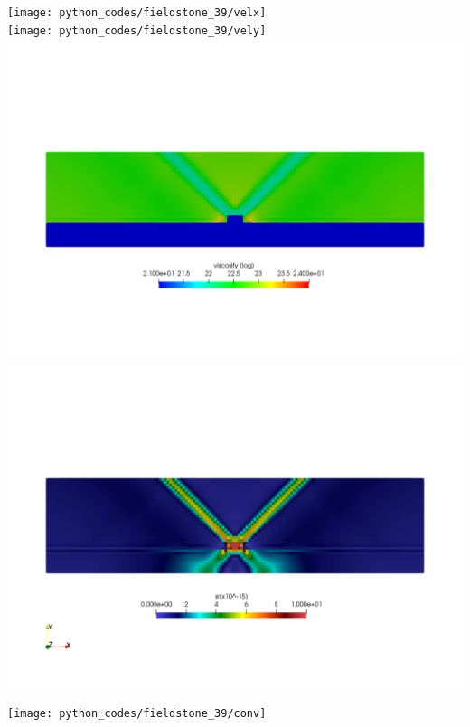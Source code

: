 \begin{center}
\texttt{[image: python\_codes/fieldstone\_39/velx]}\\
\texttt{[image: python\_codes/fieldstone\_39/vely]}\\
\includegraphics[width=.8\linewidth]{python_codes/fieldstone_39/etaeff}\\
\includegraphics[width=.8\linewidth]{python_codes/fieldstone_39/sr}
\end{center}

\begin{center}
\texttt{[image: python\_codes/fieldstone\_39/conv]}
\end{center}














